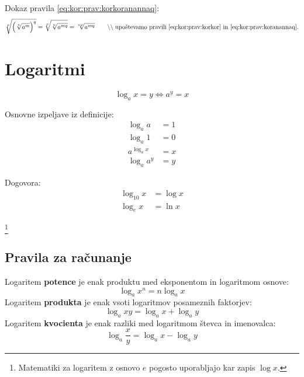 \documentclass[a4paper,oneside,12pt,fleqn]{article}
\newcommand{\comment}[1]{\ensuremath{\qquad\backslash\backslash\;}\textnormal{#1}}
\renewcommand\iff\Leftrightarrow
\numberwithin{equation}{section}
\begin{document}
Dokaz pravila \ref{eq:kor:prav:korkoranannaq}:
\[  \sqrt[p]{\left( \sqrt[n]{a^m} \right)^q} = \sqrt[p]{\sqrt[n]{a^{mq}}} =
\sqrt[np]{a^{mq}} \comment{upoštevamo pravili \eqref{eq:kor:prav:korkor} in
\eqref{eq:kor:prav:koranannaq}.} \]

\section{Logaritmi}
\label{sec:log}
\begin{equation}
  \label{eq:log:def}
  \log_a\! x = y \iff a^y = x
\end{equation}

Osnovne izpeljave iz definicije:
\begin{align}
  \log_a\! a &= 1 \label{eq:log:logaaje1} \\
  \log_a\! 1 &= 0 \label{eq:log:log1je0} \\
  a^{\log_a\! x} &= x \label{eq:log:analogax} \\
  \log_a\! a^y &= y \label{eq:log:logaanay}
\end{align}

Dogovora:
\begin{align*}
  \log_{10}\!x &= \log x \\
  \log_{e}\!x &= \ln x
\end{align*}

\vspace{-24pt}
\hspace{100pt}
\footnote{Matematiki za logaritem z osnovo $e$ pogosto uporabljajo
kar zapis $\log x$.}

\subsection{Pravila za računanje}
\label{sec:eq:log:prav}
Logaritem \textbf{potence} je enak produktu med eksponentom in logaritmom osnove:
\begin{equation}
  \log_a\! x^n = n\log_a\! x \label{eq:log:prav:loganan}
\end{equation}
Logaritem \textbf{produkta} je enak vsoti logaritmov posameznih faktorjev:
\begin{equation}
  \log_a\! xy = \log_a\!x+ \log_a\!y \label{eq:log:prav:logprod}
\end{equation}
Logaritem \textbf{kvocienta} je enak razliki med logaritmom števca in imenovalca:
\begin{equation}
  \log_a\!\frac{x}{y} = \log_a\!x-\log_a\!y \label{eq:log:prav:logkvoc}
\end{equation}
\end{document}
